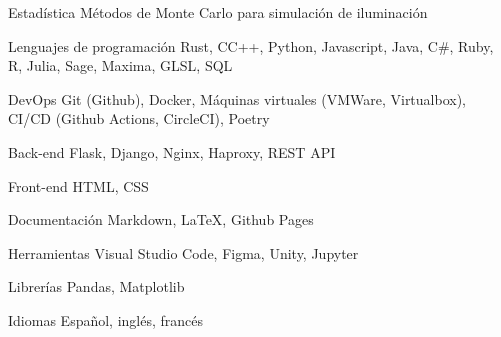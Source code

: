 

\begin{cvskills}

  \cvskill
    {Estadística}
    {Métodos de Monte Carlo para simulación de iluminación}

  \cvskill
    {Lenguajes de programación} %
    {Rust, C\/C++, Python, Javascript, Java, C\#, Ruby, R, Julia, Sage, Maxima, GLSL, SQL} %

  \cvskill
    {DevOps} %
    {Git (Github), Docker, Máquinas virtuales (VMWare, Virtualbox), CI/CD (Github Actions, CircleCI), Poetry} %

  \cvskill
    {Back-end} %
    {Flask, Django, Nginx, Haproxy, REST API} %

  \cvskill
    {Front-end} %
    {HTML, CSS} %

  \cvskill
    {Documentación}
    {Markdown, LaTeX, Github Pages}

  \cvskill
    {Herramientas}
    {Visual Studio Code, Figma, Unity, Jupyter}

  \cvskill
    {Librerías} %
    {Pandas, Matplotlib} %

  \cvskill
    {Idiomas} %
    {Español, inglés, francés} %

\end{cvskills}

